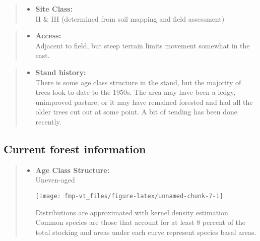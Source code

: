 \documentclass[]{tufte-handout}
\providecommand{\tightlist}{%
  \setlength{\itemsep}{0pt}\setlength{\parskip}{0pt}}
\begin{document}
\begin{quote}
\begin{itemize}
\tightlist
\item
  \textbf{Site Class:}\\
  \vspace{2pt} II \& III (determined from soil mapping and field
  assessment)
\end{itemize}
\end{quote}

\begin{quote}
\begin{itemize}
\tightlist
\item
  \textbf{Access:}\\
  \vspace{2pt} Adjacent to field, but steep terrain limits movement
  somewhat in the east.
\end{itemize}
\end{quote}

\begin{quote}
\begin{itemize}
\tightlist
\item
  \textbf{Stand history:}\\
  \vspace{2pt} There is some age class structure in the stand, but the
  majority of trees look to date to the 1950s. The area may have been a
  ledgy, unimproved pasture, or it may have remained forested and had
  all the older trees cut out at some point. A bit of tending has been
  done recently.
\end{itemize}
\end{quote}

\subsection{Current forest
information}\label{current-forest-information-1}

\begin{quote}
\begin{itemize}
\tightlist
\item
  \textbf{Age Class Structure:}\\
  \vspace{2pt} Uneven-aged\\

  \begin{marginfigure}
  \texttt{[image: fmp-vt\_files/figure-latex/unnamed-chunk-7-1]} \caption[Distributions are approximated with kernel density estimation]{Distributions are approximated with kernel density estimation. Common species are those that account for at least 8 percent of the total stocking and areas under each curve represent species basal areas.}\label{fig:unnamed-chunk-7}
  \end{marginfigure}
\end{itemize}
\end{quote}
\end{document}
